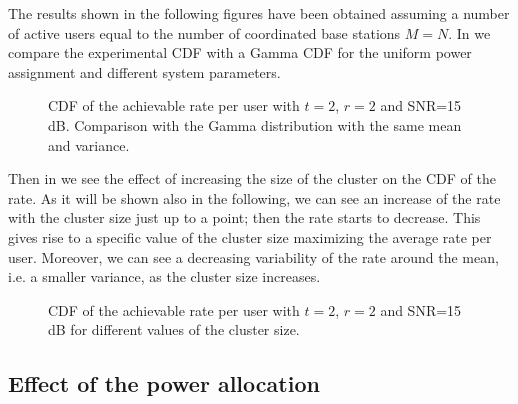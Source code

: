The results shown in the following figures have been obtained assuming a number of active users equal to the number of coordinated base stations $M=N$.
In  we compare the experimental CDF with a Gamma CDF for the uniform power assignment and different system parameters.
\begin{figure}[t]
\begin{center}
\begin{small}
\end{small}
\end{center}
\vspace*{-2.2mm}\caption{CDF of the achievable rate per user with $t=2$, $r=2$ and SNR=15\,dB.
Comparison with the Gamma distribution with the same mean and variance.}\label{CDFgamma}
\end{figure}
Then in  we see the effect of increasing the size of the cluster on the CDF of the rate. As it will be shown also in the following, we can see an increase of the rate with the cluster size just up to a point; then the rate starts to decrease. This gives rise to a specific value of the cluster size maximizing the average rate per user. Moreover, we can see a decreasing variability of the rate around the mean, i.e. a smaller variance, as the cluster size increases.
\begin{figure}[t]
\begin{center}
\begin{small}
\end{small}
\end{center}
\vspace*{-2.2mm}\caption{CDF of the achievable rate per user with $t=2$, $r=2$ and SNR=15\,dB for different values of the cluster size.}\label{CDFclusters}
\end{figure}

\subsection{Effect of the power allocation}

